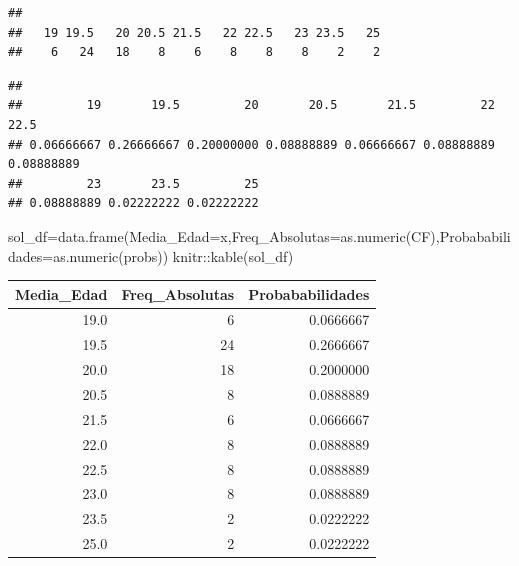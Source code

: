 \documentclass[
]{article}
\newenvironment{Shaded}{\begin{snugshade}}{\end{snugshade}}
\newcommand{\AttributeTok}[1]{\textcolor[rgb]{0.77,0.63,0.00}{#1}}
\newcommand{\FunctionTok}[1]{\textcolor[rgb]{0.00,0.00,0.00}{#1}}
\newcommand{\NormalTok}[1]{#1}
\newcommand{\OtherTok}[1]{\textcolor[rgb]{0.56,0.35,0.01}{#1}}
\newcommand{\SpecialCharTok}[1]{\textcolor[rgb]{0.00,0.00,0.00}{#1}}
\begin{document}
\begin{Shaded}
\end{Shaded}

\begin{verbatim}
## 
##   19 19.5   20 20.5 21.5   22 22.5   23 23.5   25 
##    6   24   18    8    6    8    8    8    2    2
\end{verbatim}

\begin{Shaded}
\end{Shaded}

\begin{verbatim}
## 
##         19       19.5         20       20.5       21.5         22       22.5 
## 0.06666667 0.26666667 0.20000000 0.08888889 0.06666667 0.08888889 0.08888889 
##         23       23.5         25 
## 0.08888889 0.02222222 0.02222222
\end{verbatim}

\begin{Shaded}
\begin{Highlighting}[]
\NormalTok{sol\_df}\OtherTok{=}\FunctionTok{data.frame}\NormalTok{(}\AttributeTok{Media\_Edad=}\NormalTok{x,}\AttributeTok{Freq\_Absolutas=}\FunctionTok{as.numeric}\NormalTok{(CF),}\AttributeTok{Probababilidades=}\FunctionTok{as.numeric}\NormalTok{(probs))}
\NormalTok{knitr}\SpecialCharTok{::}\FunctionTok{kable}\NormalTok{(sol\_df)}
\end{Highlighting}
\end{Shaded}

\begin{longtable}[]{@{}rrr@{}}
\toprule
Media\_Edad & Freq\_Absolutas & Probababilidades \\
\midrule
\endhead
19.0 & 6 & 0.0666667 \\
19.5 & 24 & 0.2666667 \\
20.0 & 18 & 0.2000000 \\
20.5 & 8 & 0.0888889 \\
21.5 & 6 & 0.0666667 \\
22.0 & 8 & 0.0888889 \\
22.5 & 8 & 0.0888889 \\
23.0 & 8 & 0.0888889 \\
23.5 & 2 & 0.0222222 \\
25.0 & 2 & 0.0222222 \\
\bottomrule
\end{longtable}
\end{document}
